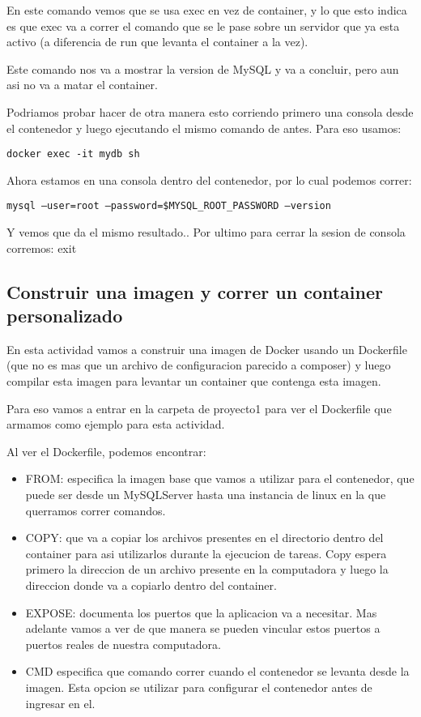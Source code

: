 \documentclass[11pt]{article} %
\begin{document}
En este comando vemos que se usa exec en vez de container, y lo que esto indica es que exec va a correr el comando que se le pase sobre un servidor que ya esta activo (a diferencia de run que levanta el container a la vez). 

Este comando nos va a mostrar la version de MySQL y va a concluir, pero aun asi no va a matar el container. 

Podriamos probar hacer de otra manera esto corriendo primero una consola desde el contenedor y luego ejecutando el mismo comando de antes. Para eso usamos:
\begin{center}
	\texttt{docker exec -it mydb sh}
\end{center}

Ahora estamos en una consola dentro del contenedor, por lo cual podemos correr:
\begin{center}
	\texttt{mysql --user=root --password=\$MYSQL\_ROOT\_PASSWORD --version}
\end{center}

Y vemos que da el mismo resultado.. Por ultimo para cerrar la sesion de consola corremos: exit


\subsection{Construir una imagen y correr un container personalizado}

En esta actividad vamos a construir una imagen de Docker usando un Dockerfile (que no es mas que un archivo de configuracion parecido a composer) y luego compilar esta imagen para levantar un container que contenga esta imagen. 

Para eso vamos a entrar en la carpeta de proyecto1 para ver el Dockerfile que armamos como ejemplo para esta actividad.

Al ver el Dockerfile, podemos encontrar:
\begin{itemize}
	\item
	FROM: especifica la imagen base que vamos a utilizar para el contenedor, que puede ser desde un MySQLServer hasta una instancia de linux en la que querramos correr comandos.

	\item
	COPY: que va a copiar los archivos presentes en el directorio dentro del container para asi utilizarlos durante la ejecucion de tareas.
	Copy espera primero la direccion de un archivo presente en la computadora y luego la direccion donde va a copiarlo dentro del container.
	
	\item	
	EXPOSE: documenta los puertos que la aplicacion va a necesitar. Mas adelante vamos a ver de que manera se pueden vincular estos puertos a puertos reales de nuestra computadora.
	
	\item
	CMD especifica que comando correr cuando el contenedor se levanta desde la imagen. Esta opcion se utilizar para configurar el contenedor antes de ingresar en el.
\end{itemize}
\end{document}
